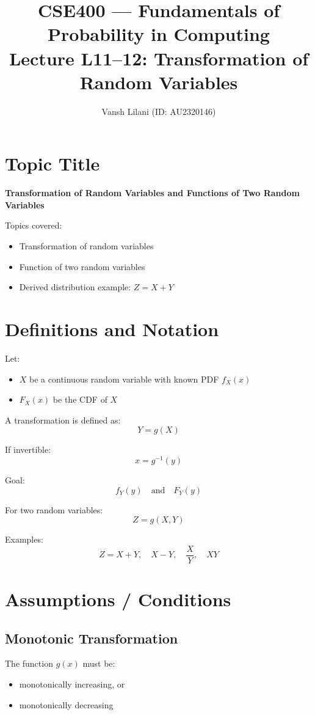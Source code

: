 \documentclass[11pt]{article}
\title{CSE400 — Fundamentals of Probability in Computing \\
Lecture L11--12: Transformation of Random Variables}
\author{Vansh Lilani (ID: AU2320146)}
\date{}
\begin{document}
\maketitle

\section{Topic Title}

\textbf{Transformation of Random Variables and Functions of Two Random Variables}

Topics covered:
\begin{itemize}
\item Transformation of random variables
\item Function of two random variables
\item Derived distribution example: $Z = X + Y$
\end{itemize}

\section{Definitions and Notation}

Let:
\begin{itemize}
\item $X$ be a continuous random variable with known PDF $f_X(x)$
\item $F_X(x)$ be the CDF of $X$
\end{itemize}

A transformation is defined as:
\[
Y = g(X)
\]

If invertible:
\[
x = g^{-1}(y)
\]

Goal:
\[
f_Y(y) \quad \text{and} \quad F_Y(y)
\]

For two random variables:
\[
Z = g(X,Y)
\]

Examples:
\[
Z = X + Y, \quad X - Y, \quad \frac{X}{Y}, \quad XY
\]

\section{Assumptions / Conditions}

\subsection{Monotonic Transformation}

The function $g(x)$ must be:
\begin{itemize}
\item monotonically increasing, or
\item monotonically decreasing
\end{itemize}
\end{document}
